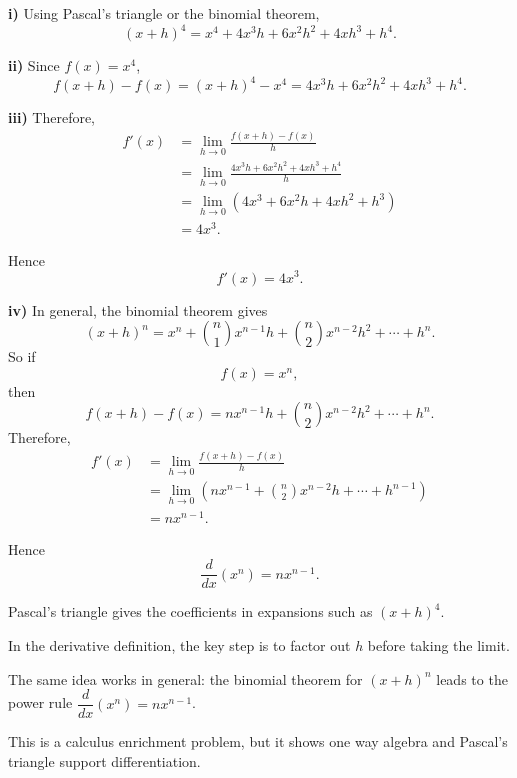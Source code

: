 \begin{solution}
\textbf{i)} Using Pascal's triangle or the binomial theorem,
\[
(x+h)^4=x^4+4x^3h+6x^2h^2+4xh^3+h^4.
\]

\textbf{ii)} Since $f(x)=x^4$,
\[
f(x+h)-f(x)
=(x+h)^4-x^4
=4x^3h+6x^2h^2+4xh^3+h^4.
\]

\textbf{iii)} Therefore,
\begin{align*}
f'(x)
&=\lim_{h\to 0}\frac{f(x+h)-f(x)}{h}\\
&=\lim_{h\to 0}\frac{4x^3h+6x^2h^2+4xh^3+h^4}{h}\\
&=\lim_{h\to 0}\left(4x^3+6x^2h+4xh^2+h^3\right)\\
&=4x^3.
\end{align*}

Hence
\[
\boxed{f'(x)=4x^3.}
\]

\textbf{iv)} In general, the binomial theorem gives
\[
(x+h)^n=x^n+\binom{n}{1}x^{n-1}h+\binom{n}{2}x^{n-2}h^2+\cdots+h^n.
\]
So if
\[
f(x)=x^n,
\]
then
\[
f(x+h)-f(x)=nx^{n-1}h+\binom{n}{2}x^{n-2}h^2+\cdots+h^n.
\]
Therefore,
\begin{align*}
f'(x)
&=\lim_{h\to 0}\frac{f(x+h)-f(x)}{h}\\
&=\lim_{h\to 0}\left(nx^{n-1}+\binom{n}{2}x^{n-2}h+\cdots+h^{n-1}\right)\\
&=nx^{n-1}.
\end{align*}

Hence
\[
\boxed{\frac{d}{dx}(x^n)=nx^{n-1}.}
\]
\end{solution}

\begin{takeaways}
\item Pascal's triangle gives the coefficients in expansions such as $(x+h)^4$.
\item In the derivative definition, the key step is to factor out $h$ before taking the limit.
\item The same idea works in general: the binomial theorem for $(x+h)^n$ leads to the power rule $\dfrac{d}{dx}(x^n)=nx^{n-1}$.
\item This is a calculus enrichment problem, but it shows one way algebra and Pascal's triangle support differentiation.
\end{takeaways}

